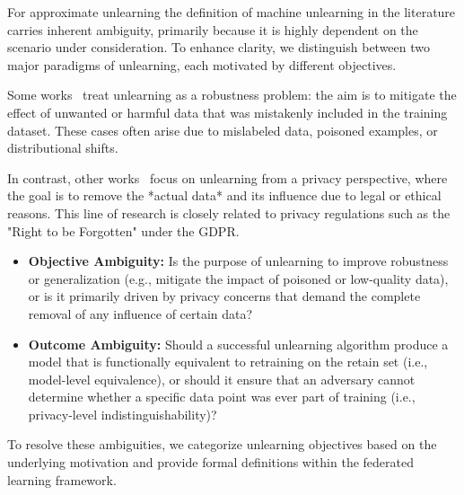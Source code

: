 \documentclass{article} %
\begin{document}
For approximate unlearning the definition of machine unlearning in the literature carries inherent ambiguity, primarily because it is highly dependent on the scenario under consideration. To enhance clarity, we distinguish between two major paradigms of unlearning, each motivated by different objectives.

Some works~\citep{exampleRobustUnlearningPaper} treat unlearning as a robustness problem: the aim is to mitigate the effect of unwanted or harmful data that was mistakenly included in the training dataset. These cases often arise due to mislabeled data, poisoned examples, or distributional shifts.

In contrast, other works~\citep{examplePrivacyUnlearningPaper} focus on unlearning from a privacy perspective, where the goal is to remove the *actual data* and its influence due to legal or ethical reasons. This line of research is closely related to privacy regulations such as the "Right to be Forgotten" under the GDPR.

\begin{itemize}
    \item \textbf{Objective Ambiguity:} Is the purpose of unlearning to improve robustness or generalization (e.g., mitigate the impact of poisoned or low-quality data), or is it primarily driven by privacy concerns that demand the complete removal of any influence of certain data?
    \item \textbf{Outcome Ambiguity:} Should a successful unlearning algorithm produce a model that is functionally equivalent to retraining on the retain set (i.e., model-level equivalence), or should it ensure that an adversary cannot determine whether a specific data point was ever part of training (i.e., privacy-level indistinguishability)?
\end{itemize}


To resolve these ambiguities, we categorize unlearning objectives based on the underlying motivation and provide formal definitions within the federated learning framework.

\vspace{0.1in}
\end{document}
